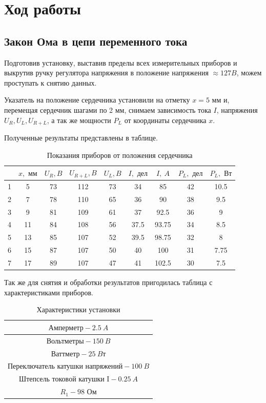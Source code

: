 \documentclass[a4paper, 12pt]{article}%
\begin{document}
\section{Ход работы}

\subsection{Закон Ома в цепи переменного тока}

Подготовив установку, выставив пределы всех измерительных приборов и выкрутив ручку регулятора напряжения в положение напряжения $\approx 127 B$, можем проступать к снятию данных.

Указатель на положение сердечника установили на отметку $x = 5 \text{ мм}$ и, перемещая сердечник шагами по 2 мм, снимаем зависимость тока $I$, напряжения $U_R, U_L, U_{R+L}$, а так же мощности $P_L$ от координаты сердечника $x$.

Полученные результаты представлены в таблице.

\begin{table}[!h]
\begin{tabular}{|c|c|c|c|c|c|c|c|c|}
\hline 
  & $x, \text{ мм}$ & $U_R, B$ & $U_{R+L}, B$ & $U_L, B$ & $I, \text{ дел}$ & $I,\ A$ & $P_L,\text{ дел}$ & $P_L,\text{ Вт}$ \\ 
\hline 
1 & 5 & 73 & 112 & 73 & 34 & 85 & 42 & 10.5 \\ 
\hline 
2 & 7 & 78 & 110 & 65 & 36 & 90 & 38 & 9.5 \\ 
\hline 
3 & 9 & 81 & 109 & 61 & 37 & 92.5 & 36 & 9 \\ 
\hline 
4 & 11 & 84 & 108 & 56 & 37.5 & 93.75 & 34 & 8.5 \\ 
\hline 
5 & 13 & 85 & 107 & 52 & 39.5 & 98.75 & 32 & 8 \\ 
\hline 
6 & 15 & 87 & 107 & 50 & 40 & 100 & 31 & 7.75 \\ 
\hline 
7 & 17 & 89 & 107 & 47 & 41 & 102.5 & 30 & 7.5 \\ 
\hline 
\end{tabular} 
\caption{Показания приборов от положения сердечника}
\end{table}

Так же для снятия и обработки результатов пригодилась таблица с характеристиками приборов.

\begin{table}[!h]
\begin{center}
\begin{tabular}{|c|}
\hline 
$\text{Амперметр} - 2.5\ A$ \\ 
\hline 
$\text{Вольтметры} - 150\ B$ \\ 
\hline 
$\text{Ваттметр}   - 25\ Bт$ \\ 
\hline 
$\text{Переключатель катушки напряжений} - 100\ B$ \\ 
\hline 
$\text{Штепсель токовой катушки I} - 0.25\ A$ \\ 
\hline 
$R_1 - 98 \text{ Ом}$ \\ 
\hline 
\end{tabular} 
\caption{Характеристики установки}
\end{center}
\end{table}
\end{document}
